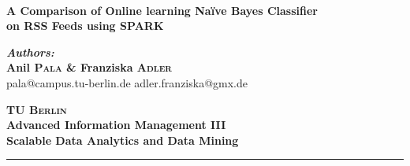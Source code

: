 \documentclass[a0,portrait]{a0poster}
\begin{document}
\pagecolor[rgb]{0.9,0.925,0.9}
 \begin{center}
    {\huge \textbf{\\A Comparison of Online learning Na\"ive Bayes Classifier\\ on RSS Feeds using SPARK\\}}
  \end{center}
\begin{minipage}{0.4\textwidth}
\begin{flushleft} \large
\textbf{\emph{Authors:}\\
Anil \textsc{Pala} \& Franziska \textsc{Adler}}\\
pala@campus.tu-berlin.de \hspace{0.5cm} adler.franziska@gmx.de
\end{flushleft}
\end{minipage}
\hfill
\begin{minipage}{0.4\textwidth}
\begin{flushright} \large
\textbf{\textsc{\color{darkred} \Large TU Berlin}\\
Advanced Information Management III\\
Scalable Data Analytics and Data Mining}
\end{flushright}
\end{minipage}
\newcommand{\HRule}{\rule[-10mm]{805mm}{1mm}} \HRule \\[0.5cm] %


\vspace{0.8cm}
\hspace{0.8cm}
\hspace{0.8cm}


\vspace{0.8cm}
\end{document}
